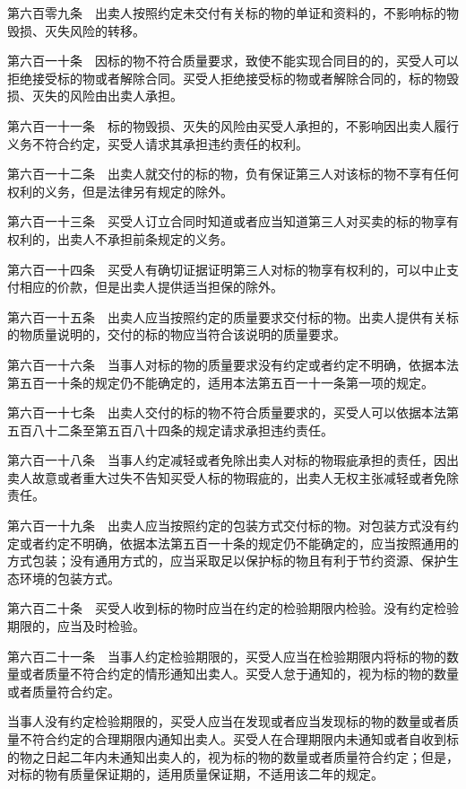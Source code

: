 \documentclass[UTF8,12pt,a4paper]{ctexbook}
\begin{document}
第六百零九条　出卖人按照约定未交付有关标的物的单证和资料的，不影响标的物毁损、灭失风险的转移。

第六百一十条　因标的物不符合质量要求，致使不能实现合同目的的，买受人可以拒绝接受标的物或者解除合同。买受人拒绝接受标的物或者解除合同的，标的物毁损、灭失的风险由出卖人承担。

第六百一十一条　标的物毁损、灭失的风险由买受人承担的，不影响因出卖人履行义务不符合约定，买受人请求其承担违约责任的权利。

第六百一十二条　出卖人就交付的标的物，负有保证第三人对该标的物不享有任何权利的义务，但是法律另有规定的除外。

第六百一十三条　买受人订立合同时知道或者应当知道第三人对买卖的标的物享有权利的，出卖人不承担前条规定的义务。

第六百一十四条　买受人有确切证据证明第三人对标的物享有权利的，可以中止支付相应的价款，但是出卖人提供适当担保的除外。

第六百一十五条　出卖人应当按照约定的质量要求交付标的物。出卖人提供有关标的物质量说明的，交付的标的物应当符合该说明的质量要求。

第六百一十六条　当事人对标的物的质量要求没有约定或者约定不明确，依据本法第五百一十条的规定仍不能确定的，适用本法第五百一十一条第一项的规定。

第六百一十七条　出卖人交付的标的物不符合质量要求的，买受人可以依据本法第五百八十二条至第五百八十四条的规定请求承担违约责任。

第六百一十八条　当事人约定减轻或者免除出卖人对标的物瑕疵承担的责任，因出卖人故意或者重大过失不告知买受人标的物瑕疵的，出卖人无权主张减轻或者免除责任。

第六百一十九条　出卖人应当按照约定的包装方式交付标的物。对包装方式没有约定或者约定不明确，依据本法第五百一十条的规定仍不能确定的，应当按照通用的方式包装；没有通用方式的，应当采取足以保护标的物且有利于节约资源、保护生态环境的包装方式。

第六百二十条　买受人收到标的物时应当在约定的检验期限内检验。没有约定检验期限的，应当及时检验。

第六百二十一条　当事人约定检验期限的，买受人应当在检验期限内将标的物的数量或者质量不符合约定的情形通知出卖人。买受人怠于通知的，视为标的物的数量或者质量符合约定。

当事人没有约定检验期限的，买受人应当在发现或者应当发现标的物的数量或者质量不符合约定的合理期限内通知出卖人。买受人在合理期限内未通知或者自收到标的物之日起二年内未通知出卖人的，视为标的物的数量或者质量符合约定；但是，对标的物有质量保证期的，适用质量保证期，不适用该二年的规定。
\end{document}
